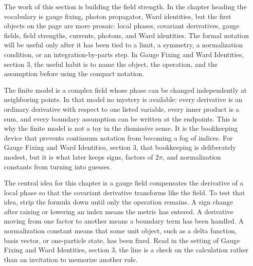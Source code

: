 











The work of this section is building the field strength.  In the chapter heading the vocabulary is gauge fixing, photon propagator, Ward identities, but the first objects on the page are more prosaic: local phases, covariant derivatives, gauge fields, field strengths, currents, photons, and Ward identities.  The formal notation will be useful only after it has been tied to a limit, a symmetry, a normalization condition, or an integration-by-parts step.  In Gauge Fixing and Ward Identities, section 3, the useful habit is to name the object, the operation, and the assumption before using the compact notation.

The finite model is a complex field whose phase can be changed independently at neighboring points.  In that model no mystery is available: every derivative is an ordinary derivative with respect to one listed variable, every inner product is a sum, and every boundary assumption can be written at the endpoints.  This is why the finite model is not a toy in the dismissive sense.  It is the bookkeeping device that prevents continuum notation from becoming a fog of indices.  For Gauge Fixing and Ward Identities, section 3, that bookkeeping is deliberately modest, but it is what later keeps signs, factors of \(2\pi\), and normalization constants from turning into guesses.

The central idea for this chapter is a gauge field compensates the derivative of a local phase so that the covariant derivative transforms like the field.  To test that idea, strip the formula down until only the operation remains.  A sign change after raising or lowering an index means the metric has entered.  A derivative moving from one factor to another means a boundary term has been handled.  A normalization constant means that some unit object, such as a delta function, basis vector, or one-particle state, has been fixed.  Read in the setting of Gauge Fixing and Ward Identities, section 3, the line is a check on the calculation rather than an invitation to memorize another rule.

